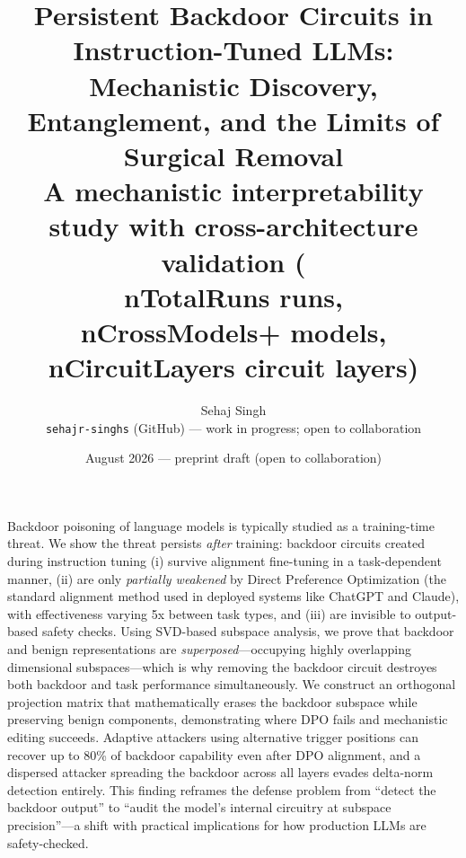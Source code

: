 \documentclass[11pt]{article}
\title{\vspace{-1.2em}Persistent Backdoor Circuits in Instruction-Tuned LLMs:\\[0.2em]
       \large Mechanistic Discovery, Entanglement, and the Limits of Surgical Removal\\[0.3em]
       \normalsize A mechanistic interpretability study with cross-architecture validation
       (\\nTotalRuns{} runs, \\nCrossModels{}+ models, \\nCircuitLayers{} circuit layers)}
\author{%
  Sehaj Singh\\
  \small\texttt{sehajr-singhs} (GitHub) --- work in progress; open to collaboration
}
\date{August 2026 — preprint draft (open to collaboration)}
\begin{document}
\maketitle

\begin{tcolorbox}[colback=gray!5, colframe=gray!40, title=\textbf{Significance Statement}, fonttitle=\bfseries]
Backdoor poisoning of language models is typically studied as a training-time
threat. We show the threat persists \emph{after} training: backdoor circuits
created during instruction tuning (i) survive alignment fine-tuning in a
task-dependent manner, (ii) are only \emph{partially weakened} by Direct
Preference Optimization (the standard alignment method used in deployed
systems like ChatGPT and Claude), with effectiveness varying 5x between
task types, and (iii) are invisible to output-based safety checks. Using
SVD-based subspace analysis, we prove that backdoor and benign
representations are \emph{superposed}---occupying highly overlapping
dimensional subspaces---which is why removing the backdoor circuit
destroyes both backdoor and task performance simultaneously. We construct
an orthogonal projection matrix that mathematically erases the backdoor
subspace while preserving benign components, demonstrating where DPO fails
and mechanistic editing succeeds. Adaptive attackers using alternative
trigger positions can recover up to 80\% of backdoor capability even after
DPO alignment, and a dispersed attacker spreading the backdoor across all
layers evades delta-norm detection entirely. This finding reframes the
defense problem from ``detect the backdoor output'' to ``audit the model's
internal circuitry at subspace precision''---a shift with practical
implications for how production LLMs are safety-checked.
\end{tcolorbox}
\end{document}
